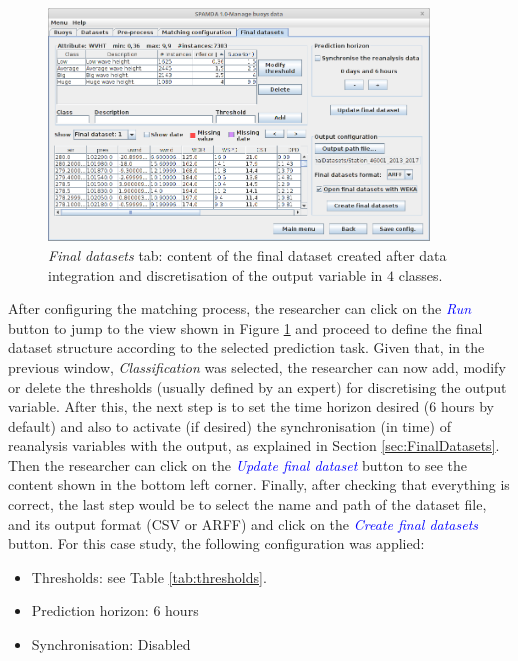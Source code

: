 \documentclass[energies,article,submit,moreauthors,pdftex]{Definitions/mdpi}
\begin{document}
			\begin{figure}[ht!]
				\centering
				\includegraphics[width=0.90\textwidth]{figures/FigureFinal_datasets.png}
				\caption{\textit{Final datasets} tab: content of the final dataset created after data integration and discretisation of the output variable in $4$ classes.}\label{fig:final_dataset}
			\end{figure}
			
			After configuring the matching process, the researcher can click on the \textcolor{blue}{\textit{Run}} button to jump to the view shown in Figure \ref{fig:final_dataset} and proceed to define the final dataset structure according to the selected prediction task. Given that, in the previous window, \textit{Classification} was selected, the researcher can now add, modify or delete the thresholds (usually defined by an expert) for discretising the output variable. After this, the next step is to set the time horizon desired (6 hours by default) and also to activate (if desired) the synchronisation (in time) of reanalysis variables with the output, as explained in Section {\ref{sec:FinalDatasets}}. Then the researcher can click on the \textcolor{blue}{\textit{Update final dataset}} button to see the content shown in the bottom left corner. Finally, after checking that everything is correct, the last step would be to select the name and path of the dataset file, and its output format (CSV or ARFF) and click on the \textcolor{blue}{\textit{Create final datasets}} button. For this case study, the following configuration was applied:
			\begin{itemize}
				\item Thresholds: see Table \ref{tab:thresholds}.
				\item Prediction horizon: 6 hours
				\item Synchronisation: Disabled
			\end{itemize}
			
\end{document}
